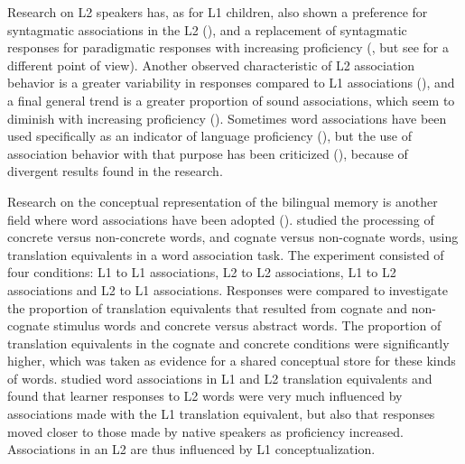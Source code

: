 \documentclass[output=paper,colorlinks,citecolor=brown,nonflat]{langsci/langscibook}
\begin{document}
Research on L2 speakers has, as for L1 children, also shown a preference for syntagmatic associations in the L2 (\citealt{Meara1978, Politzer1978}), and a replacement of syntagmatic responses for paradigmatic responses with increasing proficiency (\citealt{KhazaeenezhadAlibabaee2013}, but see \citealt{Wolter2001} for a different point of view). Another observed characteristic of L2 association behavior is a greater variability in responses compared to L1 associations (\citealt{RiegelZivian1972, Zareva2007}), and a final general trend is a greater proportion of sound associations, which seem to diminish with increasing proficiency (\citealt{RiegelZivian1972}). Sometimes word associations have been used specifically as an indicator of language proficiency (\citealt{RiegelZivian1972, Zareva2007}), but the use of association behavior with that purpose has been criticized (\citealt{KruseEtAl1987, CremerEtAl2010}), because of divergent results found in the research.

Research on the conceptual representation of the bilingual memory is another field where word associations have been adopted (\citealt{VanHellDeGroot1998, FitzpatrickIzura2011}). \citet{VanHellDeGroot1998} studied the processing of concrete versus non-concrete words, and cognate versus non-cognate words, using translation equivalents in a word association task. The experiment consisted of four conditions: L1 to L1 associations, L2 to L2 associations, L1 to L2 associations and L2 to L1 associations. Responses were compared to investigate the proportion of translation equivalents that resulted from cognate and non-cognate stimulus words and concrete versus abstract words. The proportion of translation equivalents in the cognate and concrete conditions were significantly higher, which was taken as evidence for a shared conceptual store for these kinds of words. \citet{Verspoor2008} studied word associations in L1 and L2 translation equivalents and found that learner responses to L2 words were very much influenced by associations made with the L1 translation equivalent, but also that responses moved closer to those made by native speakers as proficiency increased. Associations in an L2 are thus influenced by L1 conceptualization.
\end{document}
